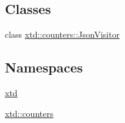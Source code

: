 \subsection*{Classes}
\begin{DoxyCompactItemize}
\item 
class \hyperlink{classxtd_1_1counters_1_1JsonVisitor}{xtd\+::counters\+::\+Json\+Visitor}
\end{DoxyCompactItemize}
\subsection*{Namespaces}
\begin{DoxyCompactItemize}
\item 
 \hyperlink{namespacextd}{xtd}
\item 
 \hyperlink{namespacextd_1_1counters}{xtd\+::counters}
\end{DoxyCompactItemize}
